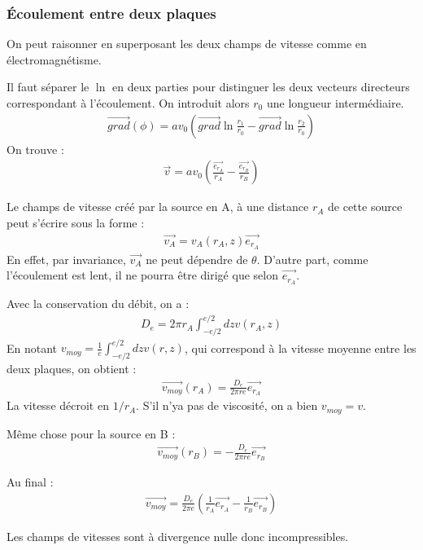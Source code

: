\documentclass{report}
\begin{document}
\subsubsection*{Écoulement entre deux plaques}

On peut raisonner en superposant les deux champs de vitesse comme en électromagnétisme. 

Il faut séparer le $\ln$ en deux parties pour distinguer les deux vecteurs directeurs correspondant à l'écoulement. On introduit alors $r_0$ une longueur intermédiaire.
\begin{align*}
	\vec{grad}(\phi)=av_0\left(\vec{grad}\ln\frac{r_1}{r_0}-\vec{grad}\ln\frac{r_2}{r_0} \right) 
\end{align*}
On trouve :
\begin{align*}
\vec{v}=av_0\left(\frac{\vec{e_{r_A}}}{r_A}-\frac{\vec{e_{r_B}}}{r_B} \right) 
\end{align*}

Le champs de vitesse créé par la source en A, à une distance $r_A$ de cette source peut s'écrire sous la forme :
\begin{align*}
	\vec{v_A} = v_A(r_A,z)\vec{e_{r_A}}
\end{align*} 
En effet, par invariance, $\vec{v_A}$ ne peut dépendre de $\theta$. D'autre part, comme l'écoulement est lent, il ne pourra être dirigé que selon $\vec{e_{r_A}}$.

Avec la conservation du débit, on a :
\begin{align*}
	D_e = 2\pi r_A\int_{-e/2}^{e/2}dz v(r_A,z)
\end{align*}
En notant $v_{moy}=\frac{1}{e}\int_{-e/2}^{e/2}dz v(r,z)$, qui correspond à la vitesse moyenne entre les deux plaques, on obtient :
\begin{align*}
	\vec{v_{moy}}(r_A) = \frac{D_e}{2\pi r e}\vec{e_{r_A}}
\end{align*}
La vitesse décroit en $1/r_A$. S'il n'ya pas de viscosité, on a bien $v_{moy}=v$.

Même chose pour la source en B :
\begin{align*}
	\vec{v_{moy}}(r_B) = -\frac{D_e}{2\pi r e}\vec{e_{r_B}}
\end{align*}

Au final : 
\begin{align*}
	\vec{v_{moy}} = \frac{D_e}{2\pi e}\left( \frac{1}{r_A}\vec{e_{r_A}} - \frac{1}{r_B}\vec{e_{r_B}}\right) 
\end{align*}

Les champs de vitesses sont à divergence nulle donc incompressibles.
\end{document}
